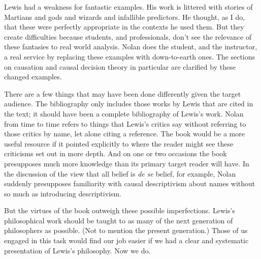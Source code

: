 \documentclass[
  11pt,
  letterpaper,
  DIV=11,
  numbers=noendperiod,
  oneside]{scrartcl}
\begin{document}
Lewis had a weakness for fantastic examples. His work is littered with
stories of Martians and gods and wizards and infallible predictors. He
thought, as I do, that these were perfectly appropriate in the contexts
he used them. But they create difficulties because students, and
professionals, don't see the relevance of these fantasies to real world
analysis. Nolan does the student, and the instructor, a real service by
replacing these examples with down-to-earth ones. The sections on
causation and causal decision theory in particular are clarified by
these changed examples.

There are a few things that may have been done differently given the
target audience. The bibliography only includes those works by Lewis
that are cited in the text; it should have been a complete bibliography
of Lewis's work. Nolan from time to time refers to things that Lewis's
critics say without referring to those critics by name, let alone citing
a reference. The book would be a more useful resource if it pointed
explicitly to where the reader might see these criticisms set out in
more depth. And on one or two occasions the book presupposes much more
knowledge than its primary target reader will have. In the discussion of
the view that all belief is \emph{de se} belief, for example, Nolan
suddenly presupposes familiarity with causal descriptivism about names
without so much as introducing descriptivism.

But the virtues of the book outweigh these possible imperfections.
Lewis's philosophical work should be taught to as many of the next
generation of philosophers as possible. (Not to mention the present
generation.) Those of us engaged in this task would find our job easier
if we had a clear and systematic presentation of Lewis's philosophy. Now
we do.
\end{document}

